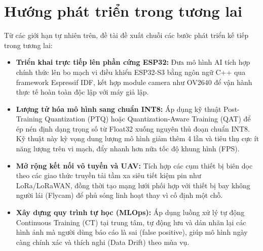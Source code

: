 \documentclass[12pt,a4paper]{report}
\begin{document}
\section{Hướng phát triển trong tương lai}

Từ các giới hạn tự nhiên trên, đề tài đề xuất chuỗi các bước phát triển kế tiếp trong tương lai:
\begin{itemize}
    \item \textbf{Triển khai trực tiếp lên phần cứng ESP32:} Đưa mô hình AI tích hợp chính thức lên bo mạch vi điều khiển ESP32-S3 bằng ngôn ngữ C++ qua framework Espressif IDF, kết hợp module camera như OV2640 để vận hành thực tế hoàn toàn độc lập với máy giả lập.
    \item \textbf{Lượng tử hóa mô hình sang chuẩn INT8:} Áp dụng kỹ thuật Post-Training Quantization (PTQ) hoặc Quantization-Aware Training (QAT) để ép nén định dạng trọng số từ Float32 xuống nguyên thủ đoạn chuẩn INT8. Kỹ thuật này kỳ vọng dung lượng mô hình giảm thêm 4 lần và tiêu thụ cực ít năng lượng trên vi mạch, đẩy nhanh hơn nữa tốc độ khung hình (FPS).
    \item \textbf{Mở rộng kết nối vô tuyến và UAV:} Tích hợp các cụm thiết bị biên dọc theo các giao thức truyền tải tầm xa siêu tiết kiệm pin như LoRa/LoRaWAN, đồng thời tạo mạng lưới phối hợp với thiết bị bay không người lái (Flycam) để phủ sóng linh hoạt thay vì cố định một chỗ.
    \item \textbf{Xây dựng quy trình tự học (MLOps):} Áp dụng luồng xử lý tự động Continuous Training (CT) tại trung tâm, tự động lưu và dán nhãn lại các hình ảnh mà người dùng báo cáo là sai (false positive), giúp mô hình ngày càng chính xác và thích nghi (Data Drift) theo mùa vụ.
\end{itemize}
\end{document}
